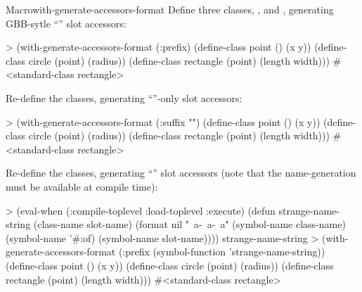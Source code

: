 \documentclass[10pt,twoside,english,pdftex]{article}
\begin{document}
\begin{functiondoc}{Macro}{with-generate-accessors-format}
\fnexamples
Define three classes, ,  and
, generating GBB-sytle
``'' slot accessors:
\begin{example}
> (with-generate-accessors-format (:prefix)
    (define-class point ()
      (x y))
    (define-class circle (point)
      (radius))
    (define-class rectangle (point)
      (length width)))
#<standard-class rectangle>
\end{example}

Re-define the classes, generating 
``''-only slot accessors:
\begin{example}
> (with-generate-accessors-format (:suffix "")
    (define-class point ()
      (x y))
    (define-class circle (point)
      (radius))
    (define-class rectangle (point)
      (length width)))
#<standard-class rectangle>
\end{example}

Re-define the classes, generating
``'' slot accessors (note that the
 name-generation  must be available at
compile time):
\begin{example}
> (eval-when (:compile-toplevel :load-toplevel :execute)
    (defun strange-name-string (class-name slot-name)
      (format nil "~a-~a-~a" 
        (symbol-name class-name) 
        (symbol-name '#:of)
        (symbol-name slot-name))))
strange-name-string
> (with-generate-accessors-format (:prefix (symbol-function 'strange-name-string))
    (define-class point ()
      (x y))
    (define-class circle (point)
      (radius))
    (define-class rectangle (point)
      (length width)))
#<standard-class rectangle>
\end{example}

\end{functiondoc}

\end{document}
